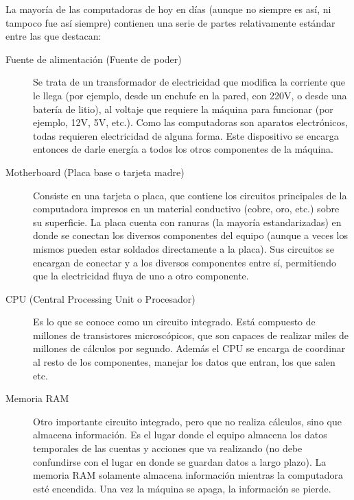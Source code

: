 La mayoría de las computadoras de hoy en días (aunque no siempre es así, ni
tampoco fue así siempre) contienen una serie de partes relativamente estándar
entre las que destacan:
\begin{description}
    \item[Fuente de alimentación (Fuente de poder)] Se trata de un transformador de
        electricidad que modifica la corriente que le llega (por ejemplo, desde
        un enchufe en la pared, con 220V, o desde una batería de litio), al
        voltaje que requiere la máquina para funcionar (por ejemplo, 12V, 5V,
        etc.). Como las computadoras son aparatos electrónicos, todas requieren
        electricidad de alguna forma. Este dispositivo se encarga entonces de
        darle energía a todos los otros componentes de la máquina.
    \item[Motherboard (Placa base o tarjeta madre)] Consiste
        en una tarjeta o placa, que contiene los circuitos principales de la
        computadora impresos en un material conductivo (cobre, oro, etc.) sobre
        su superficie. La placa cuenta con ranuras (la mayoría estandarizadas)
        en donde se conectan los diversos componentes del equipo (aunque a veces
        los mismos pueden estar soldados directamente a la placa). Sus circuitos
        se encargan de conectar y a los diversos componentes entre sí,
        permitiendo que la electricidad fluya de uno a otro componente.
    \item[CPU (Central Processing Unit o Procesador)] Es lo que se
        conoce como un circuito integrado. Está compuesto de millones de
        transistores microscópicos, que son capaces de realizar miles de
        millones de cálculos por segundo. Además el CPU se encarga de coordinar
        al resto de los componentes, manejar los datos que entran, los que salen
        etc.
    \item[Memoria RAM] Otro importante circuito integrado,
        pero que no realiza cálculos, sino que almacena información. Es el lugar
        donde el equipo almacena los datos temporales de las cuentas y acciones
        que va realizando (no debe confundirse con el lugar en donde se guardan
        datos a largo plazo). La memoria RAM solamente almacena información
        mientras la computadora esté encendida. Una vez la máquina se apaga, la
        información se pierde.
\end{description}

